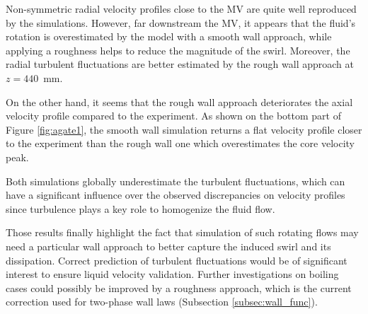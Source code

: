 Non-symmetric radial velocity profiles close to the MV are quite well reproduced by the simulations. However, far downstream the MV, it appears that the fluid's rotation is overestimated by the model with a smooth wall approach, while applying a roughness helps to reduce the magnitude of the swirl. Moreover, the radial turbulent fluctuations are better estimated by the rough wall approach at $z=440$~mm.

On the other hand, it seems that the rough wall approach deteriorates the axial velocity profile compared to the experiment. As shown on the bottom part of Figure \ref{fig:agate1}, the smooth wall simulation returns a flat velocity profile closer to the experiment than the rough wall one which overestimates the core velocity peak.

Both simulations globally underestimate the turbulent fluctuations, which can have a significant influence over the observed discrepancies on velocity profiles since turbulence plays a key role to homogenize the fluid flow. 

Those results finally highlight the fact that simulation of such rotating flows may need a particular wall approach to better capture the induced swirl and its dissipation. Correct prediction of turbulent fluctuations would be of significant interest to ensure liquid velocity validation. Further investigations on boiling cases could possibly be improved by a roughness approach, which is the current correction used for two-phase wall laws (Subsection \ref{subsec:wall_func}). 